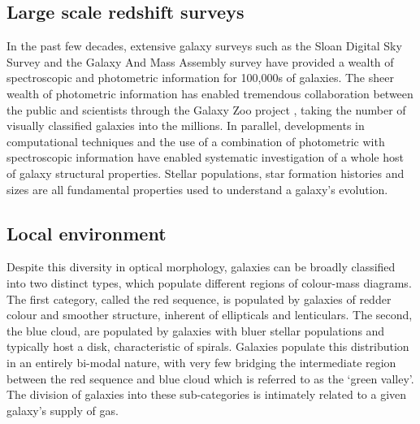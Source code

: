 \subsection{Large scale redshift surveys}
In the past few decades, extensive galaxy surveys such as the Sloan Digital Sky Survey \citep[SDSS,][]{york2000} and the Galaxy And Mass Assembly survey \citep[][]{driver2009} have provided a wealth of spectroscopic and photometric information for 100,000s of galaxies. The sheer wealth of photometric information has enabled tremendous collaboration between the public and scientists through the Galaxy Zoo project \citep[e.g.][]{lintott2008, lintott2011, willett2013}, taking the number of visually classified galaxies into the millions. In parallel, developments in computational techniques and the use of a combination of photometric with spectroscopic information have enabled systematic investigation of a whole host of galaxy structural properties. Stellar populations, star formation histories and sizes are all fundamental properties used to understand a galaxy's evolution. 

\subsection{Local environment}
 Despite this diversity in optical morphology, galaxies can be broadly classified into two distinct types, which populate different regions of colour-mass diagrams. The first category, called the red sequence, is populated by galaxies of redder colour and smoother structure, inherent of ellipticals and lenticulars. The second, the blue cloud, are populated by galaxies with bluer stellar populations and typically host a disk, characteristic of spirals. Galaxies populate this distribution in an entirely bi-modal nature, with very few bridging the intermediate region between the red sequence and blue cloud which is referred to as the `green valley'. The division of galaxies into these sub-categories is intimately related to a given galaxy's supply of gas. 

